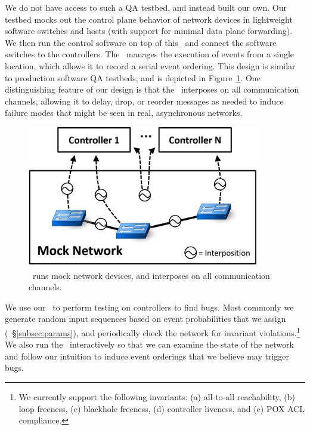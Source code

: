 We do not have access to such a QA testbed, and instead built our own.
Our testbed mocks out the control plane
behavior of network devices in lightweight software switches and hosts (with
support for minimal data plane forwarding).
We then run the control software on
top of this \tester~and connect the software switches to the
controllers. The \tester~manages the execution of events from a single location,
which allows it to record a serial
event ordering. This design is similar to production software QA testbeds, and is
depicted in Figure~\ref{fig:architecture}. One distinguishing feature of our
design is that
the \tester~interposes on all communication
channels, allowing it to delay, drop, or reorder
messages as needed to induce failure modes that might be seen in
real, asynchronous networks.

\begin{figure}[tb]
    \centering
    \includegraphics[width=0.9\textwidth]{../diagrams/architecture/Debugger_Architecture.png}
    \caption{\label{fig:architecture} \projectname~runs mock
    network devices, and interposes on all communication
    channels.}
\end{figure}

We use our \tester~to perform testing on controllers to find
bugs. Most commonly we generate random input
sequences based on event probabilities that we assign (\cf~\S\ref{subsec:params}), and periodically
check the network for invariant violations.\footnote{We currently support the following invariants:
  (a) all-to-all reachability, (b) loop freeness, (c) blackhole freeness, (d) controller
liveness, and (e) POX ACL compliance.
}
We also run the \tester~interactively
so that we can examine the state of the network
and follow our intuition to induce event orderings that we believe may trigger bugs.

